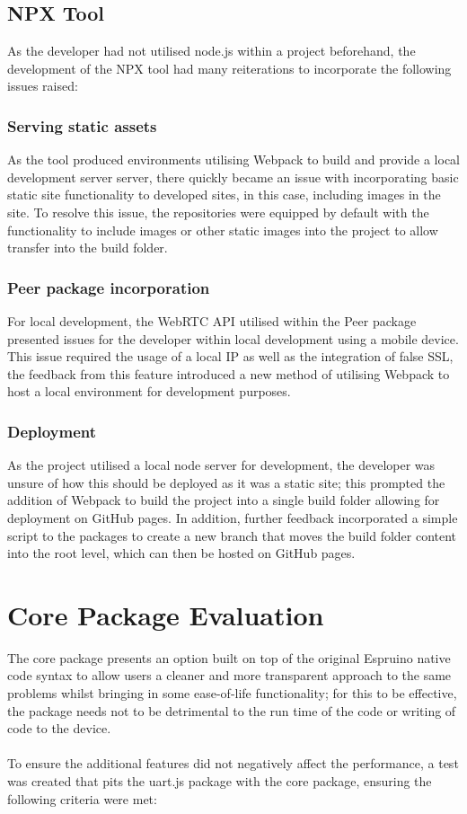 \documentclass{l4proj}
\begin{document}
\subsection{NPX Tool}
As the developer had not utilised node.js within a project beforehand, the development of the NPX tool had many reiterations to incorporate the following issues raised:
\subsubsection{Serving static assets}
As the tool produced environments utilising Webpack to build and provide a local development server server, there quickly became an issue with incorporating basic static site functionality to developed sites, in this case, including images in the site. To resolve this issue, the repositories were equipped by default with the functionality to include images or other static images into the project to allow transfer into the build folder.
\subsubsection{Peer package incorporation}
For local development, the WebRTC API utilised within the Peer package presented issues for the developer within local development using a mobile device. This issue required the usage of a local IP as well as the integration of false SSL, the feedback from this feature introduced a new method of utilising Webpack to host a local environment for development purposes.
\subsubsection{Deployment}
As the project utilised a local node server for development, the developer was unsure of how this should be deployed as it was a static site; this prompted the addition of Webpack to build the project into a single build folder allowing for deployment on GitHub pages. In addition, further feedback incorporated a simple script to the packages to create a new branch that moves the build folder content into the root level, which can then be hosted on GitHub pages.
\section{Core Package Evaluation}

The core package presents an option built on top of the original Espruino native code syntax to allow users a cleaner and more transparent approach to the same problems whilst bringing in some ease-of-life functionality; for this to be effective, the package needs not to be detrimental to the run time of the code or writing of code to the device.
\\ \\
To ensure the additional features did not negatively affect the performance, a test was created that pits the uart.js package with the core package, ensuring the following criteria were met:
\end{document}

